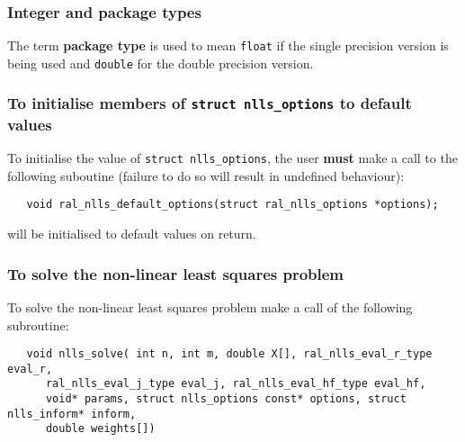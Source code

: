 \documentclass{spec}
\begin{document}
\hslarguments

\subsubsection{Integer and package types}
The term {\bf package type} is used to mean \texttt{float}
if the single precision version is being used and
\texttt{double} for the double precision version.

\subsubsection{To initialise members of \texttt{struct nlls\_options} to default values}

To initialise the value of \texttt{struct nlls\_options}, the user \textbf{must} make a
call to the following suboutine (failure to do so will result in undefined behaviour):
\begin{verbatim}
   void ral_nlls_default_options(struct ral_nlls_options *options);
\end{verbatim}

\begin{description}
    will be initialised to default values on return.
\end{description}

\subsubsection{To solve the non-linear least squares problem}
\label{sec:solve}

To solve the non-linear least squares problem make a call of the following
subroutine:

\begin{verbatim}
   void nlls_solve( int n, int m, double X[], ral_nlls_eval_r_type eval_r,
      ral_nlls_eval_j_type eval_j, ral_nlls_eval_hf_type eval_hf,
      void* params, struct nlls_options const* options, struct nlls_inform* inform,
      double weights[])
\end{verbatim}
\end{document}
